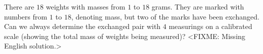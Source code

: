 \problem
There are $18$ weights with masses from $1$ to $18$ grams.
They are marked with numbers from $1$ to $18$, denoting mass, but two of the
marks have been exchanged.
Can we always determine the exchanged pair with $4$ measurings on a calibrated
scale (showing the total mass of weights being measured)?
\solution
<FIXME: Missing English solution.>
\endproblem

